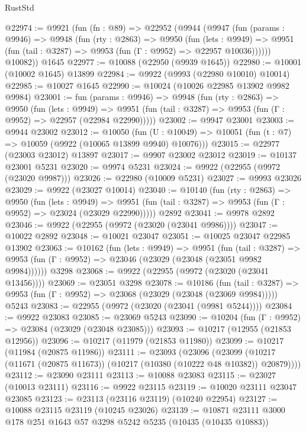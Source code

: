 \begin{lexlean}{RustStd}
\begin{coremodule}
@22974 := @9921
    (fun (fn : @89) =>
    @22952
      (@9944
        (@9947
          (fun (params : @9946) =>
          @9948
            (fun (rty : @2863) =>
            @9950
              (fun (lets : @9949) =>
              @9951 (fun (tail : @3287) => @9953 (fun (Γ : @9952) => @22957 @10036))))))
        @10082))
    @1645
@22977 := @10088 (@22950 (@9939 @1645))
@22980 := @10001 (@10002 @1645) @13899
@22984 := @9922 (@9993 (@22980 @10010) @10014)
@22985 := @10027 @1645
@22990 := @10024 (@10026 @22985 @13902 @9982 @9984)
@23001 := fun (params : @9946) =>
  @9948
    (fun (rty : @2863) =>
    @9950
      (fun (lets : @9949) =>
      @9951 (fun (tail : @3287) => @9953 (fun (Γ : @9952) => @22957 (@22984 @22990)))))
@23002 := @9947 @23001
@23003 := @9944 @23002
@23012 := @10050
    (fun (U : @10049) => @10051 (fun (t : @7) => @10059 (@9922 (@10065 @13899 @9940) @10076)))
@23015 := @22977 (@23003 @23012) @13897
@23017 := @9907 @23002 @23012
@23019 := @10137 @23001 @5231
@23020 := @9974 @5231
@23024 := @9922 (@22955 (@9972 (@23020 @9987)))
@23026 := @22980 (@10009 @5231)
@23027 := @9993 @23026
@23029 := @9922 (@23027 @10014)
@23040 := @10140
    (fun (rty : @2863) =>
    @9950
      (fun (lets : @9949) =>
      @9951 (fun (tail : @3287) => @9953 (fun (Γ : @9952) => @23024 (@23029 @22990)))))
    @2892
@23041 := @9978 @2892
@23046 := @9922 (@22955 (@9972 (@23020 (@23041 @9986))))
@23047 := @10022 @2892
@23048 := @10021 @23047
@23051 := @10025 @23047 @22985 @13902
@23063 := @10162
    (fun (lets : @9949) =>
    @9951
      (fun (tail : @3287) =>
      @9953 (fun (Γ : @9952) => @23046 (@23029 (@23048 (@23051 @9982 @9984))))))
    @3298
@23068 := @9922 (@22955 (@9972 (@23020 (@23041 @13456))))
@23069 := @23051 @3298
@23078 := @10186
    (fun (tail : @3287) => @9953 (fun (Γ : @9952) => @23068 (@23029 (@23048 (@23069 @9984)))))
    @5243
@23083 := @22955 (@9972 (@23020 (@23041 (@9981 @5244))))
@23084 := @9922 @23083
@23085 := @23069 @5243
@23090 := @10204 (fun (Γ : @9952) => @23084 (@23029 (@23048 @23085)))
@23093 := @10217 (@12955 (@21853 @12956))
@23096 := @10217 (@11979 (@21853 @11980))
@23099 := @10217 (@11984 (@20875 @11986))
@23111 := @23093
    (@23096 (@23099 (@10217 (@11671 (@20875 @11673)) (@10217 (@10380 (@10222 @48 @10382)) @20879))))
@23112 := @23090 @23111
@23113 := @10088 @23083
@23115 := @23027 (@10013 @23111)
@23116 := @9922 @23115
@23119 := @10020 @23111 @23047 @23085
@23123 := @23113 (@23116 @23119) (@10240 @22954)
@23127 := @10088 @23115 @23119 (@10245 @23026)
@23139 := @10871 @23111 @3000 @178 @251 @1643 @57 @3298 @5242 @5235 (@10435 (@10435 @10883))

\end{coremodule}
\end{lexlean}
